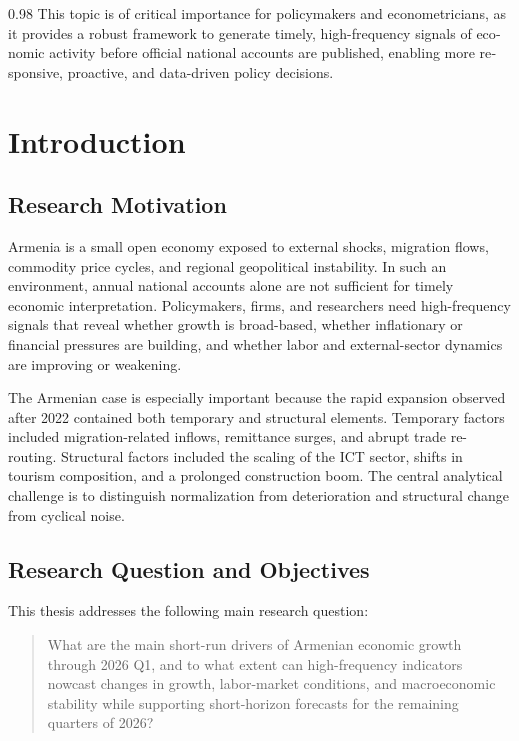 \documentclass[12pt,a4paper]{report}
\begin{document}
\begin{english}
\begin{spacing}{0.98}
        This topic is of critical importance for policymakers and econometricians, as it provides a robust framework to generate timely, high-frequency signals of economic activity before official national accounts are published, enabling more responsive, proactive, and data-driven policy decisions.
        \par
        \end{spacing}
        \end{english}
        \clearpage
        \tableofcontents

        \clearpage
        \hypersetup{pageanchor=true}
\chapter{Introduction}
\section{Research Motivation}
Armenia is a small open economy exposed to external shocks, migration flows, commodity price cycles, and regional geopolitical instability. In such an environment, annual national accounts alone are not sufficient for timely economic interpretation. Policymakers, firms, and researchers need high-frequency signals that reveal whether growth is broad-based, whether inflationary or financial pressures are building, and whether labor and external-sector dynamics are improving or weakening.

The Armenian case is especially important because the rapid expansion observed after 2022 contained both temporary and structural elements. Temporary factors included migration-related inflows, remittance surges, and abrupt trade re-routing. Structural factors included the scaling of the ICT sector, shifts in tourism composition, and a prolonged construction boom. The central analytical challenge is to distinguish normalization from deterioration and structural change from cyclical noise.

\section{Research Question and Objectives}
This thesis addresses the following main research question:

\begin{quote}
What are the main short-run drivers of Armenian economic growth through 2026 Q1, and to what extent can high-frequency indicators nowcast changes in growth, labor-market conditions, and macroeconomic stability while supporting short-horizon forecasts for the remaining quarters of 2026?
\end{quote}
\end{document}
